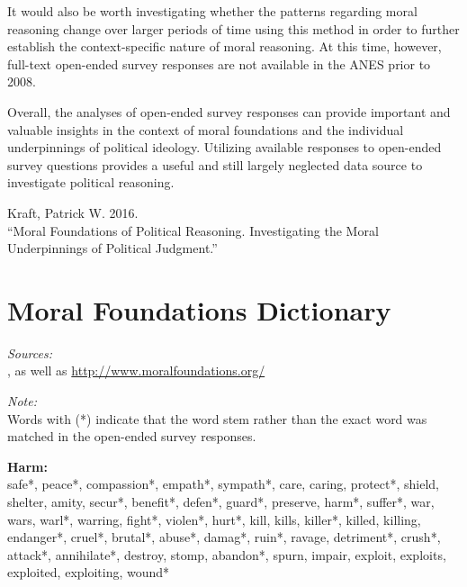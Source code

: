 \documentclass[12pt]{article}
\begin{document}
It would also be worth investigating whether the patterns regarding moral reasoning change over larger periods of time using this method in order to further establish the context-specific nature of moral reasoning. At this time, however, full-text open-ended survey responses are not available in the ANES prior to 2008.

Overall, the analyses of open-ended survey responses can provide important and valuable insights in the context of moral foundations and the individual underpinnings of political ideology. Utilizing available responses to open-ended survey questions provides a useful and still largely neglected data source to investigate political reasoning.


\clearpage



\clearpage
\flushleft\footnotesize\singlespacing
\appendices
\appendixpage
\renewcommand\thesubsection{\Roman{subsection}}
Kraft, Patrick W. 2016.\\``Moral Foundations of Political Reasoning. Investigating the Moral Underpinnings of Political Judgment.''

\startcontents[sections]
\clearpage

\section{Moral Foundations Dictionary}\label{app:dict}
\renewcommand\thefigure{\thesection.\arabic{figure}}
\renewcommand\thetable{\thesection.\arabic{table}}
\setcounter{figure}{0}
\setcounter{table}{0}

\textit{Sources:}\\
\citet{graham2009liberals}, as well as \url{http://www.moralfoundations.org/}
\vspace{.5cm}

\textit{Note:}\\
Words with (*) indicate that the word stem rather than the exact word was matched in the open-ended survey responses.
\vspace{.5cm}

\textbf{Harm:}\\
safe*, peace*, compassion*, empath*, sympath*, care, caring, protect*, shield, shelter, amity, secur*, benefit*, defen*, guard*, preserve, harm*, suffer*, war, wars, warl*, warring, fight*, violen*, hurt*, kill, kills, killer*, killed, killing, endanger*, cruel*, brutal*, abuse*, damag*, ruin*, ravage, detriment*, crush*, attack*, annihilate*, destroy, stomp, abandon*, spurn, impair, exploit, exploits, exploited, exploiting, wound*
\vspace{.5cm}
\end{document}
